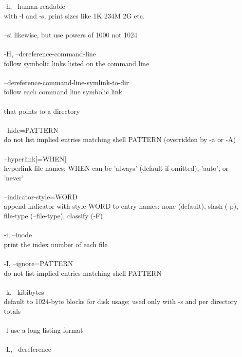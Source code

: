 \documentclass{article}
\begin{document}
       -h, --human-readable \\
              with -l and -s, print sizes like 1K 234M 2G etc. \\
\\
       --si   likewise, but use powers of 1000 not 1024 \\
\\
       -H, --dereference-command-line \\
              follow symbolic links listed on the command line \\
\\
       --dereference-command-line-symlink-to-dir \\
              follow each command line symbolic link \\
\\
              that points to a directory \\
\\
       --hide=PATTERN \\
              do not list implied entries matching shell  PATTERN  (overridden
              by -a or -A) \\
\\
       --hyperlink[=WHEN] \\
              hyperlink file names; WHEN can be 'always' (default if omitted),
              'auto', or 'never' \\
\\
       --indicator-style=WORD \\
              append indicator with style WORD to entry names: none (default),
              slash (-p), file-type (--file-type), classify (-F) \\
\\
       -i, --inode \\
              print the index number of each file \\
\\
       -I, --ignore=PATTERN \\
              do not list implied entries matching shell PATTERN \\
\\
       -k, --kibibytes \\
              default  to  1024-byte  blocks for disk usage; used only with -s
              and per directory totals \\
\\
       -l     use a long listing format \\
\\
       -L, --dereference \\
\end{document}
